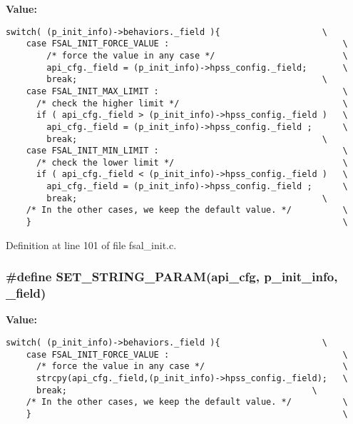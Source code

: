 \textbf{Value:}

\begin{Code}\begin{verbatim}switch( (p_init_info)->behaviors._field ){                    \
    case FSAL_INIT_FORCE_VALUE :                                  \
        /* force the value in any case */                         \
        api_cfg._field = (p_init_info)->hpss_config._field;       \
        break;                                                \
    case FSAL_INIT_MAX_LIMIT :                                    \
      /* check the higher limit */                                \
      if ( api_cfg._field > (p_init_info)->hpss_config._field )   \
        api_cfg._field = (p_init_info)->hpss_config._field ;      \
        break;                                                \
    case FSAL_INIT_MIN_LIMIT :                                    \
      /* check the lower limit */                                 \
      if ( api_cfg._field < (p_init_info)->hpss_config._field )   \
        api_cfg._field = (p_init_info)->hpss_config._field ;      \
        break;                                                \
    /* In the other cases, we keep the default value. */          \
    }                                                             \
\end{verbatim}
\end{Code}


Definition at line 101 of file fsal\_\-init.c.
\subsubsection[{SET\_\-STRING\_\-PARAM}]{\setlength{\rightskip}{0pt plus 5cm}\#define SET\_\-STRING\_\-PARAM(api\_\-cfg, \/  p\_\-init\_\-info, \/  \_\-field)}\label{fsal__init_8c_7e81fe711a5c74c6137e9ee255672ff7}


\textbf{Value:}

\begin{Code}\begin{verbatim}switch( (p_init_info)->behaviors._field ){                    \
    case FSAL_INIT_FORCE_VALUE :                                  \
      /* force the value in any case */                           \
      strcpy(api_cfg._field,(p_init_info)->hpss_config._field);   \
      break;                                                \
    /* In the other cases, we keep the default value. */          \
    }                                                             \
\end{verbatim}
\end{Code}


